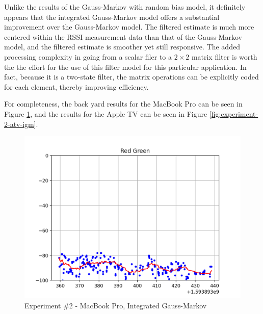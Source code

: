 \documentclass[12pt]{article}
\begin{document}
Unlike the results of the Gauss-Markov with random bias model, it definitely appears that
the integrated Gauss-Markov model offers a substantial improvement over the Gauss-Markov
model. The filtered estimate is much more centered within the RSSI measurement data than
that of the Gauss-Markov model, and the filtered estimate is smoother yet still responsive.
The added processing complexity in going from a scalar filer to a $2 \times 2$ matrix
filter is worth the the effort for the use of this filter model for this particular
application. In fact, because it is a two-state filter, the matrix operations can be
explicitly coded for each element, thereby improving efficiency.

For completeness, the back yard results for the MacBook Pro can be seen in Figure
\ref{fig:experiment-2-mbp-igm}, and the results for the Apple TV can be seen in Figure
\ref{fig:experiment-2-atv-igm}.

\begin{figure}[ht]
    \centering
    \includegraphics[width=1.0\textwidth]{Experiment-2-MBP-IGM.png}
    \caption{Experiment \#2 - MacBook Pro, Integrated Gauss-Markov}
    \label{fig:experiment-2-mbp-igm}
\end{figure}
\end{document}
